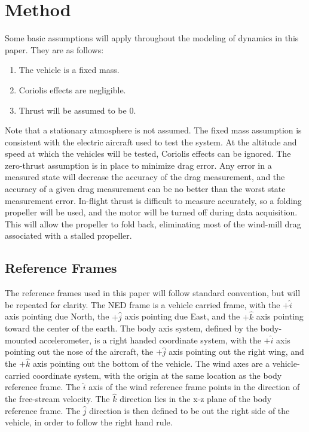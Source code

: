 \section{Method}
\label{background-information}
Some basic assumptions will apply throughout the modeling of dynamics in this paper. They are as follows:
\begin{enumerate}
\item The vehicle is a fixed mass.
\item Coriolis effects are negligible.
\item Thrust will be assumed to be 0.
\end{enumerate}
Note that a stationary atmosphere is not assumed. The fixed mass assumption is consistent with the electric aircraft used to test the system. At the altitude and speed at which the vehicles will be tested, Coriolis effects can be ignored\cite{klein2006aircraft}. The zero-thrust assumption is in place to minimize drag error. Any error in a measured state will decrease the accuracy of the drag measurement, and the accuracy of a given drag measurement can be no better than the worst state measurement error. In-flight thrust is difficult to measure accurately, so a folding propeller will be used, and the motor will be turned off during data acquisition. This will allow the propeller to fold back, eliminating most of the wind-mill drag associated with a stalled propeller. 

\subsection*{Reference Frames}
The reference frames used in this paper will follow standard convention\cite{klein2006aircraft}, but will be repeated for clarity. The NED frame is a vehicle carried frame, with the $+\hat{i}$ axis pointing due North, the $+\hat{j}$ axis pointing due East, and the $+\hat{k}$ axis pointing toward the center of the earth. The body axis system, defined by the body-mounted accelerometer, is a right handed coordinate system, with the $+\hat{i}$ axis pointing out the nose of the aircraft, the $+\hat{j}$ axis pointing out the right wing, and the $+\hat{k}$ axis pointing out the bottom of the vehicle. The wind axes are a vehicle-carried coordinate system, with the origin at the same location as the body reference frame. The $\hat{i}$ axis of the wind reference frame points in the direction of the free-stream velocity. The $\hat{k}$ direction lies in the x-z plane of the body reference frame. The $\hat{j}$ direction is then defined to be out the right side of the vehicle, in order to follow the right hand rule. 

